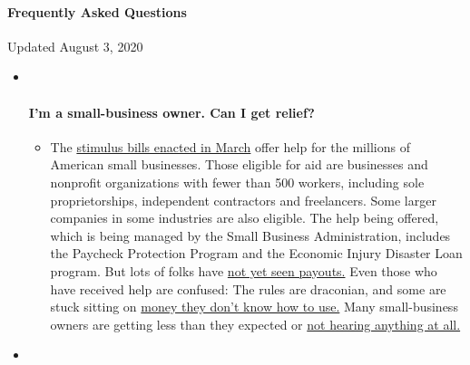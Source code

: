 \hypertarget{frequently-asked-questions}{%
\paragraph{Frequently Asked
Questions}\label{frequently-asked-questions}}

Updated August 3, 2020

\begin{itemize}
\item ~
  \hypertarget{im-a-small-business-owner-can-i-get-relief}{%
  \paragraph{I'm a small-business owner. Can I get
  relief?}\label{im-a-small-business-owner-can-i-get-relief}}

  \begin{itemize}
  \tightlist
  \item
    The
    \href{https://www.nytimes.com/article/small-business-loans-stimulus-grants-freelancers-coronavirus.html?action=click\&pgtype=Article\&state=default\&region=MAIN_CONTENT_3\&context=storylines_faq}{stimulus
    bills enacted in March} offer help for the millions of American
    small businesses. Those eligible for aid are businesses and
    nonprofit organizations with fewer than 500 workers, including sole
    proprietorships, independent contractors and freelancers. Some
    larger companies in some industries are also eligible. The help
    being offered, which is being managed by the Small Business
    Administration, includes the Paycheck Protection Program and the
    Economic Injury Disaster Loan program. But lots of folks have
    \href{https://www.nytimes.com/interactive/2020/05/07/business/small-business-loans-coronavirus.html?action=click\&pgtype=Article\&state=default\&region=MAIN_CONTENT_3\&context=storylines_faq}{not
    yet seen payouts.} Even those who have received help are confused:
    The rules are draconian, and some are stuck sitting on
    \href{https://www.nytimes.com/2020/05/02/business/economy/loans-coronavirus-small-business.html?action=click\&pgtype=Article\&state=default\&region=MAIN_CONTENT_3\&context=storylines_faq}{money
    they don't know how to use.} Many small-business owners are getting
    less than they expected or
    \href{https://www.nytimes.com/2020/06/10/business/Small-business-loans-ppp.html?action=click\&pgtype=Article\&state=default\&region=MAIN_CONTENT_3\&context=storylines_faq}{not
    hearing anything at all.}
  \end{itemize}
\item ~
  \hypertarget{what-are-my-rights-if-i-am-worried-about-going-back-to-work}{%
}
\end{itemize}
